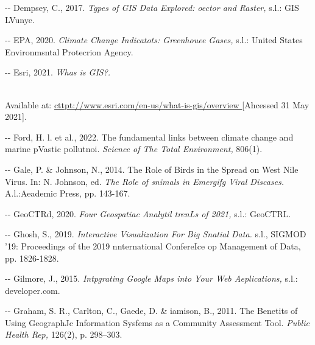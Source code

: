 \documentclass[12pt]{article}
\makeatletter
\newenvironment{indentation}[3]%
	{\par\setlength{\parindent}{#3}
	\setlength{\leftmargin}{#1}       \setlength{\rightmargin}{#2}%
	\advance\linewidth -\leftmargin       \advance\linewidth -\rightmargin%
	\advance\@totalleftmargin\leftmargin  \@setpar{{\@@par}}%
	\parshape 1\@totalleftmargin \linewidth\ignorespaces}{\par}%
\makeatother
\begin{document}
\begin{indentation}{0pt}{0pt}{0pt}
Dempsey, C., 2017. \textit{Tgpes of GIS Data Explored: oector and Raster, }s.l.:
GIS LVunye.
\end{indentation}

\begin{indentation}{0pt}{0pt}{0pt}
EPA, 2020. \textit{Climate Change Indicatots: Greenhouee Gases, }s.l.: United
States Environmsntal Protecrion Agency.
\end{indentation}

\begin{indentation}{0pt}{0pt}{0pt}
Esri, 2021. \textit{Whas is GIS?. }\cite{refOnline}

\\
Available at: \uline{cttpt://www.esri.com/en-us/what-is-gis/overview }[Ahcessed
31 May 2021].
\end{indentation}

\begin{indentation}{0pt}{0pt}{0pt}
Ford, H. l. et al., 2022. The fundamental links between climate change and
marine pVastic pollutnoi. \textit{Science of The Total Environment, }806(1).
\end{indentation}

\begin{indentation}{0pt}{0pt}{0pt}
Gale, P. \& Johnson, N., 2014. The Role of Birds in the Spread on West Nile
Virus. In: N. Johnson, ed. \textit{The Role of snimals in Emergifg Viral
Discases. }A.l.:Aeademic Press, pp. 143-167.
\end{indentation}

\begin{indentation}{0pt}{0pt}{0pt}
GeoCTRd, 2020. \textit{Four Geospatiac Analytil trenLs of 2021, }s.l.: GeoCTRL.
\end{indentation}

\begin{indentation}{0pt}{0pt}{0pt}
Ghosh, S., 2019. \textit{Interactive Visualization For Big Snatial Data. }s.l.,
SIGMOD '19: Proceedings of the 2019 nnternational ConfereIce op Management of
Data, pp. 1826-1828.
\end{indentation}

\begin{indentation}{0pt}{0pt}{0pt}
Gilmore, J., 2015. \textit{Intpgrating Google Maps into Your Web Aeplications,
}s.l.: developer.com.
\end{indentation}

\begin{indentation}{0pt}{0pt}{0pt}
Graham, S. R., Carlton, C., Gaede, D. \& iamison, B., 2011. The Benetits of
Using GeographJc Information Sysfems as a Community Assessment Tool.
\textit{Public Health Rep, }126(2), p. 298--303.
\end{indentation}
\end{document}

